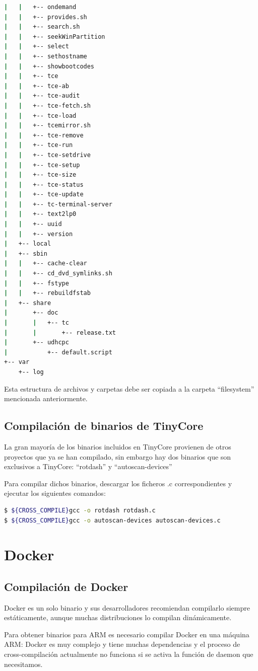 \documentclass{tfg}
\begin{document}
{\begin{lstlisting}[language=bash,caption=Lista de archivos a conservar]
|   |   +-- ondemand
|   |   +-- provides.sh
|   |   +-- search.sh
|   |   +-- seekWinPartition
|   |   +-- select
|   |   +-- sethostname
|   |   +-- showbootcodes
|   |   +-- tce
|   |   +-- tce-ab
|   |   +-- tce-audit
|   |   +-- tce-fetch.sh
|   |   +-- tce-load
|   |   +-- tcemirror.sh
|   |   +-- tce-remove
|   |   +-- tce-run
|   |   +-- tce-setdrive
|   |   +-- tce-setup
|   |   +-- tce-size
|   |   +-- tce-status
|   |   +-- tce-update
|   |   +-- tc-terminal-server
|   |   +-- text2lp0
|   |   +-- uuid
|   |   +-- version
|   +-- local
|   +-- sbin
|   |   +-- cache-clear
|   |   +-- cd_dvd_symlinks.sh
|   |   +-- fstype
|   |   +-- rebuildfstab
|   +-- share
|       +-- doc
|       |   +-- tc
|       |       +-- release.txt
|       +-- udhcpc
|           +-- default.script
+-- var
    +-- log
\end{lstlisting}}

Esta estructura de archivos y carpetas debe ser copiada a la carpeta ``filesystem'' mencionada anteriormente.

\subsection{Compilación de binarios de TinyCore}
La gran mayoría de los binarios incluidos en TinyCore provienen de otros proyectos que ya se han compilado,
sin embargo hay dos binarios que son exclusivos a TinyCore: ``rotdash'' y ``autoscan-devices''

Para compilar dichos binarios, descargar los ficheros .c correspondientes \cite{tinycorebinaries} y ejecutar los siguientes comandos:
\begin{lstlisting}[language=bash,caption=Compilacion de binarios de TinyCore]
$ ${CROSS_COMPILE}gcc -o rotdash rotdash.c
$ ${CROSS_COMPILE}gcc -o autoscan-devices autoscan-devices.c
\end{lstlisting}

\section{Docker}
\subsection{Compilación de Docker}
Docker es un solo binario y sus desarrolladores recomiendan compilarlo siempre estáticamente, aunque muchas distribuciones lo compilan dinámicamente.

Para obtener binarios para ARM es necesario compilar Docker en una máquina ARM: Docker es muy complejo y tiene muchas dependencias y el proceso de cross-compilación actualmente no funciona si se activa la función de daemon que necesitamos.
\end{document}
